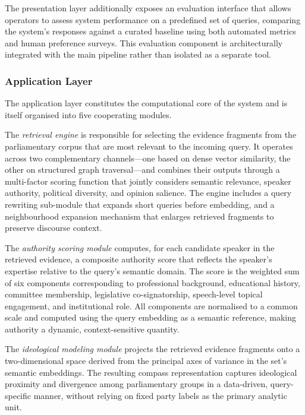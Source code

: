 The presentation layer additionally exposes an evaluation interface that allows operators
to assess system performance on a predefined set of queries, comparing the system's
responses against a curated baseline using both automated metrics and human preference
surveys. This evaluation component is architecturally integrated with the main pipeline
rather than isolated as a separate tool.

\subsubsection{Application Layer}

The application layer constitutes the computational core of the system and is itself
organised into five cooperating modules.

The \textit{retrieval engine} is responsible for selecting the evidence fragments from the
parliamentary corpus that are most relevant to the incoming query. It operates across two
complementary channels---one based on dense vector similarity, the other on structured
graph traversal---and combines their outputs through a multi-factor scoring function that
jointly considers semantic relevance, speaker authority, political diversity, and opinion
salience. The engine includes a query rewriting sub-module that expands short queries
before embedding, and a neighbourhood expansion mechanism that enlarges retrieved fragments
to preserve discourse context.

The \textit{authority scoring module} computes, for each candidate speaker in the retrieved
evidence, a composite authority score that reflects the speaker's expertise relative to the
query's semantic domain. The score is the weighted sum of six components corresponding to
professional background, educational history, committee membership, legislative
co-signatorship, speech-level topical engagement, and institutional role. All components
are normalised to a common scale and computed using the query embedding as a semantic
reference, making authority a dynamic, context-sensitive quantity.

The \textit{ideological modeling module} projects the retrieved evidence fragments onto a
two-dimensional space derived from the principal axes of variance in the set's semantic
embeddings. The resulting compass representation captures ideological proximity and
divergence among parliamentary groups in a data-driven, query-specific manner, without
relying on fixed party labels as the primary analytic unit.

